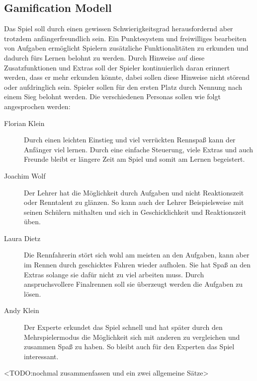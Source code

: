 \subsection{Gamification Modell}\label{ssec:gamification-modell}
	Das Spiel soll durch einen gewissen Schwierigkeitsgrad herausfordernd aber trotzdem anfängerfreundlich sein. Ein Punktesystem und freiwilliges bearbeiten von Aufgaben ermöglicht Spielern zusätzliche Funktionalitäten zu erkunden und dadurch fürs Lernen belohnt zu werden.
	Durch Hinweise auf diese Zusatzfunktionen und Extras soll der Spieler kontinuierlich daran erinnert werden, dass er mehr erkunden könnte, dabei sollen diese Hinweise nicht störend oder aufdringlich sein.
	Spieler sollen für den ersten Platz durch Nennung nach einem Sieg belohnt werden.
	Die verschiedenen Personas sollen wie folgt angesprochen werden:
	\begin{description}
		\item[Florian Klein]{
			Durch einen leichten Einstieg und viel verrückten Rennspaß kann der Anfänger viel lernen. Durch eine einfache Steuerung, viele Extras und auch Freunde bleibt er längere Zeit am Spiel und somit am Lernen begeistert.
		}
		\item[Joachim Wolf]{
			Der Lehrer hat die Möglichkeit durch Aufgaben und nicht Reaktionszeit oder Renntalent zu glänzen. So kann auch der Lehrer Beispielsweise mit seinen Schülern mithalten und sich in Geschicklichkeit und Reaktionszeit üben.
		}
		\item[Laura Dietz]{
			Die Rennfahrerin stört sich wohl am meisten an den Aufgaben, kann aber im Rennen durch geschicktes Fahren wieder aufholen. Sie hat Spaß an den Extras solange sie dafür nicht zu viel arbeiten muss.
			Durch anspruchsvollere Finalrennen soll sie überzeugt werden die Aufgaben zu lösen.
		}
		\item[Andy Klein]{
			Der Experte erkundet das Spiel schnell und hat später durch den Mehrspielermodus die Möglichkeit sich mit anderen zu vergleichen und zusammen Spaß zu haben. So bleibt auch für den Experten das Spiel interessant.
		}
	\end{description}
	<TODO:nochmal zusammenfassen und ein zwei allgemeine Sätze>

